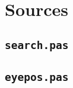 
\section{Sources}
\label{implem:sources}

\subsection{\tt search.pas}
\label{implem:sources:search}

\begin{tgrind}
%  
\end{tgrind}

\subsection{\tt eyepos.pas}
\label{implem:sources:eyepos}

\begin{tgrind}
%  
\end{tgrind}
